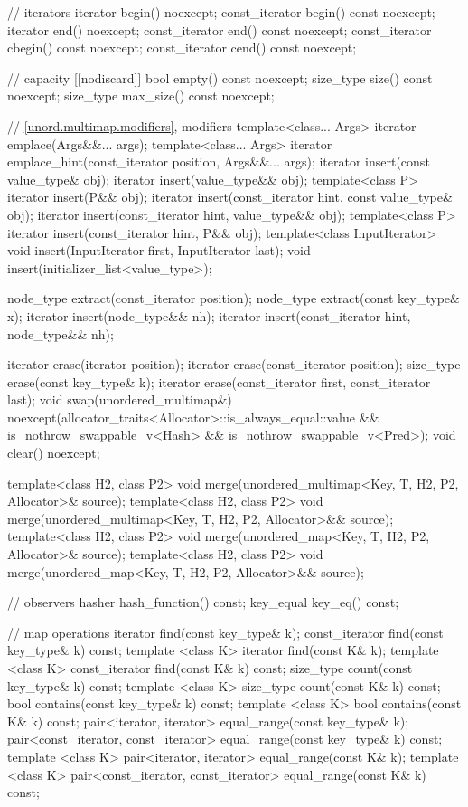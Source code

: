 \begin{codeblock}
{{    // iterators
    iterator       begin() noexcept;
    const_iterator begin() const noexcept;
    iterator       end() noexcept;
    const_iterator end() const noexcept;
    const_iterator cbegin() const noexcept;
    const_iterator cend() const noexcept;

    // capacity
    [[nodiscard]] bool empty() const noexcept;
    size_type size() const noexcept;
    size_type max_size() const noexcept;

    // \ref{unord.multimap.modifiers}, modifiers
    template<class... Args> iterator emplace(Args&&... args);
    template<class... Args> iterator emplace_hint(const_iterator position, Args&&... args);
    iterator insert(const value_type& obj);
    iterator insert(value_type&& obj);
    template<class P> iterator insert(P&& obj);
    iterator insert(const_iterator hint, const value_type& obj);
    iterator insert(const_iterator hint, value_type&& obj);
    template<class P> iterator insert(const_iterator hint, P&& obj);
    template<class InputIterator> void insert(InputIterator first, InputIterator last);
    void insert(initializer_list<value_type>);

    node_type extract(const_iterator position);
    node_type extract(const key_type& x);
    iterator insert(node_type&& nh);
    iterator insert(const_iterator hint, node_type&& nh);

    iterator  erase(iterator position);
    iterator  erase(const_iterator position);
    size_type erase(const key_type& k);
    iterator  erase(const_iterator first, const_iterator last);
    void      swap(unordered_multimap&)
      noexcept(allocator_traits<Allocator>::is_always_equal::value &&
               is_nothrow_swappable_v<Hash> &&
               is_nothrow_swappable_v<Pred>);
    void      clear() noexcept;

    template<class H2, class P2>
      void merge(unordered_multimap<Key, T, H2, P2, Allocator>& source);
    template<class H2, class P2>
      void merge(unordered_multimap<Key, T, H2, P2, Allocator>&& source);
    template<class H2, class P2>
      void merge(unordered_map<Key, T, H2, P2, Allocator>& source);
    template<class H2, class P2>
      void merge(unordered_map<Key, T, H2, P2, Allocator>&& source);

    // observers
    hasher hash_function() const;
    key_equal key_eq() const;

    // map operations
    iterator         find(const key_type& k);
    const_iterator   find(const key_type& k) const;
    template <class K>
      iterator       find(const K& k);
    template <class K>
      const_iterator find(const K& k) const;
    size_type        count(const key_type& k) const;
    template <class K>
      size_type      count(const K& k) const;
    bool             contains(const key_type& k) const;
    template <class K>
      bool           contains(const K& k) const;
    pair<iterator, iterator>               equal_range(const key_type& k);
    pair<const_iterator, const_iterator>   equal_range(const key_type& k) const;
    template <class K>
      pair<iterator, iterator>             equal_range(const K& k);
    template <class K>
      pair<const_iterator, const_iterator> equal_range(const K& k) const;

}}
\end{codeblock}
